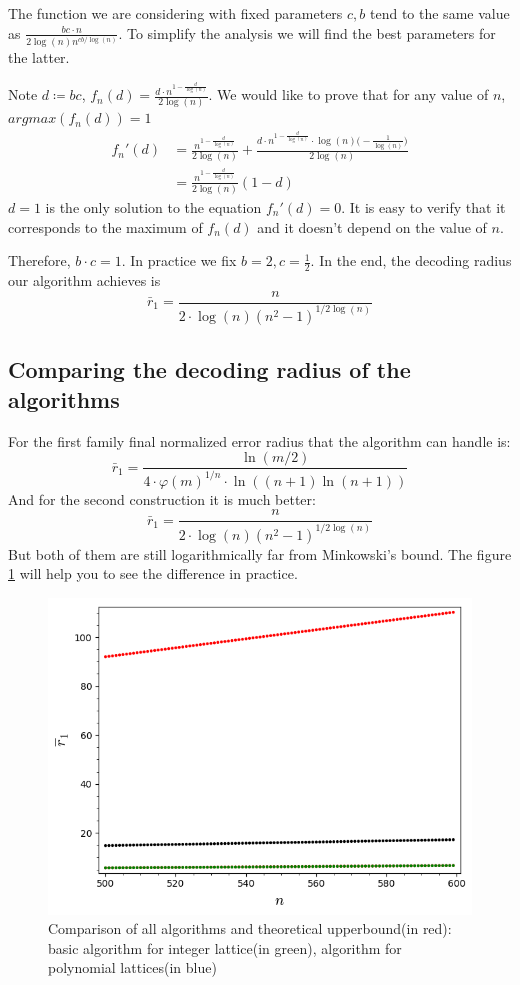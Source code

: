 \documentclass[12pt]{article}
\begin{document}
The function we are considering with fixed parameters $c, b$ tend to the same value as $\frac{bc \cdot n}{2\log(n)n^{cb/\log(n)}}$. To simplify the analysis we will find the best parameters for the latter.

Note $d \coloneqq bc$, $f_n(d) = \frac{d \cdot n^{1 - \frac{d}
{\log(n)} }}{2\log(n)}$.
We would like to prove that for any value of $n$, $argmax(f_n(d)) = 1$
\[
\begin{split}
    f_n'(d) & = \frac{n^{1 - \frac{d}
    {\log(n)}}}{2\log(n)} + \frac{d \cdot n^{1 - \frac{d}
    {\log(n)}} \cdot \log(n) \big(-\frac{1}{\log(n)}\big)}{2\log(n)} \\
    & = \frac{n^{1 - \frac{d}{\log(n)}}}{2\log(n)}(1-d)
\end{split}
\]
$d = 1$ is the only solution to the equation $f_n'(d) = 0$. It is easy to verify that it corresponds to the maximum of $f_n(d)$ and it doesn't depend on the value of $n$.

Therefore, $b \cdot c = 1$. In practice we fix $b = 2, c = \frac{1}{2}$. In the end, the decoding radius our algorithm achieves is
\[
    \bar{r}_1 = \frac{n}{2 \cdot \log(n)(n^{2} - 1)^{1/2\log(n)}}
\]

\subsection{Comparing the decoding radius of the algorithms}
\label{sec:comparison}

For the first family final normalized error radius that the algorithm can handle is:
\[
    \bar{r}_1 = \frac{\ln(m/2)}{4 \cdot \varphi(m)^{1/n} \cdot \ln((n+1)\ln(n+1))}
\]
And for the second construction it is much better:
\[
    \bar{r}_1 = \frac{n}{2 \cdot \log(n)(n^{2} - 1)^{1/2\log(n)}}
\]
But both of them are still logarithmically far from Minkowski's bound. The figure \ref{fig:everything} will help you to see the difference in practice.

\begin{figure}
  \includegraphics[width=\linewidth]{plot5.png}
  \caption{Comparison of all algorithms and theoretical upperbound(in red): basic algorithm for integer lattice(in green), algorithm for polynomial lattices(in blue)}
  \label{fig:everything}
\end{figure}
\end{document}
